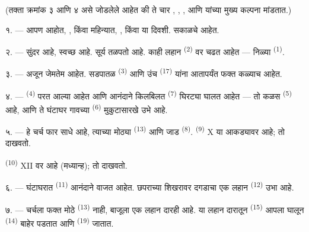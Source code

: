(तक्ता क्रमांक ३ आणि ४ असे जोडलेले आहेत की ते चार 
, , ,  आणि 
यांच्या मुख्य कल्पना मांडतात.)

\VUsaut{4.0mm}
\VUsaut{3.0mm}

\VUsaut{2.4mm}

\VUsaut{3.0mm}

१. --- आपण  आहोत, ,  किंवा
 महिन्यात,  ,
 किंवा  या दिवशी. सकाळचे 
आहेत.

२. ---  सुंदर आहे,  स्वच्छ आहे. सूर्य तळपतो आहे.
काही लहान  \textsuperscript{(2)} वर चढत आहेत --- निळ्या
 \textsuperscript{(1)}.

३. ---  अजून जेमतेम  आहेत. सडपातळ
 \textsuperscript{(3)} आणि उंच 
\textsuperscript{(17)} यांना आतापर्यंत फक्त कळ्याच आहेत.

४. ---  \textsuperscript{(4)} परत आल्या आहेत आणि आनंदाने
किलबिलत  \textsuperscript{(7)} घिरट्या घालत आहेत --- तो कळस
 \textsuperscript{(5)} आहे, आणि ते घंटाघर गावच्या
 \textsuperscript{(6)} मुकुटासारखे उभे आहे.

\VUsaut{3.4mm}
\VUsaut{3.0mm}

५. --- हे चर्च फार साधे आहे, त्याच्या मोठ्या 
\textsuperscript{(13)} आणि जाड  \textsuperscript{(8)}.
 \textsuperscript{(9)} X या आकड्यावर आहे; तो 
दाखवतो.

 \textsuperscript{(10)} XII वर आहे (मध्यान्ह); तो 
दाखवतो.

६. --- घंटाघरात  \textsuperscript{(11)} आनंदाने वाजत आहेत. छपराच्या
शिखरावर दगडाचा एक लहान  \textsuperscript{(12)} उभा आहे.

७. --- चर्चला फक्त मोठे  \textsuperscript{(13)} नाही, बाजूला एक
लहान दारही आहे. या लहान दारातून  \textsuperscript{(15)} आपला
 घालून  \textsuperscript{(14)} बाहेर पडतात आणि
 \textsuperscript{(19)} जातात.


